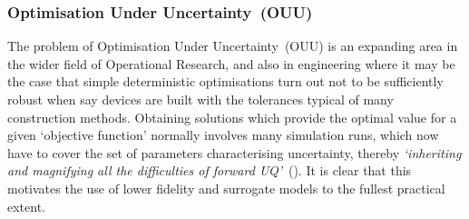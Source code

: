 \subsubsection{Optimisation Under Uncertainty~(OUU)}\label{sec:OUU}

The problem of Optimisation Under Uncertainty~(OUU) is an expanding area in the wider field of
Operational Research, and also in 
engineering where it may be the case that simple deterministic optimisations turn out not to be
sufficiently robust when say devices are built with the tolerances typical of many construction methods.
Obtaining solutions which provide the optimal value for a given `objective function'
normally involves many simulation runs, which now have to cover
the set of parameters characterising uncertainty, thereby
{\it `inheriting and magnifying all the difficulties of forward UQ'}~(\cite{Na18Unce}).
It is clear that this motivates the use of lower fidelity and surrogate models to the fullest practical extent.
 


